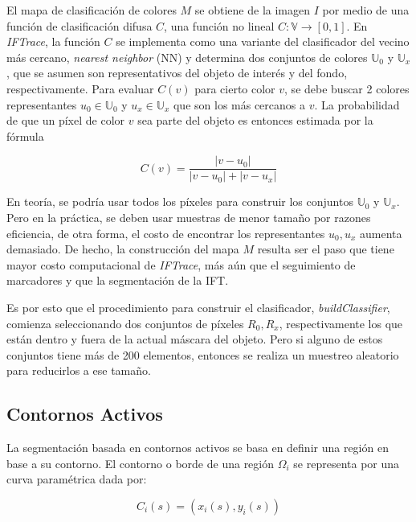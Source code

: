 \documentclass[a4paper,10pt]{article}
\begin{document}
El mapa de clasificación de colores $M$ se obtiene de la imagen $I$ por medio de una
función de clasificación difusa $C$, una función no lineal $C : \mathbb{V} \to [0,1]$.
En \textit{IFTrace}, la función $C$ se implementa como una variante del clasificador
del vecino más cercano, \textit{nearest neighbor} (NN) y determina dos conjuntos de
colores $\mathbb{U}_{0}$ y $\mathbb{U}_{x}$, que se asumen son representativos del objeto de interés y del fondo, respectivamente.
Para evaluar $C(v)$ para
cierto color $v$, se debe buscar 2 colores representantes $u_{0} \in \mathbb{U}_{0}$
y $u_{x} \in \mathbb{U}_{x}$ que son los más cercanos a $v$.
La probabilidad de que un píxel de color $v$ sea parte del objeto es entonces estimada
por la fórmula

\begin{equation}
   \label{eq:IFTrace-color-classifier}
   C(v) = \frac{|v - u_{0}|}{|v - u_{0}| + |v - u_{x}|}
\end{equation}

En teoría, se podría usar todos los píxeles para construir los conjuntos
$\mathbb{U}_{0}$ y $\mathbb{U}_{x}$. Pero en la práctica, se deben usar muestras
de menor tamaño por razones eficiencia, de otra forma, el costo de encontrar los
representantes $u_{0},u_{x}$ aumenta demasiado. De hecho, la construcción del mapa
$M$ resulta ser el paso que tiene mayor costo computacional de \textit{IFTrace}, más
aún que el seguimiento de marcadores y que la segmentación de la IFT.

Es por esto que el procedimiento para construir el clasificador,
\textit{buildClassifier}, comienza seleccionando dos conjuntos de píxeles
$R_{0},R_{x}$, respectivamente los que están dentro y fuera de la actual máscara
del objeto. Pero si alguno de estos conjuntos tiene más de 200 elementos,
entonces se realiza un muestreo aleatorio para reducirlos a ese tamaño.

\subsection{Contornos Activos}

La segmentación basada en contornos activos se basa en definir una región en base a su contorno.
El contorno o borde de una región $\Omega_i$ se representa por una curva paramétrica dada por:

\begin{equation}
    C_i(s) = (x_i(s), y_i(s))
\end{equation}
\end{document}
